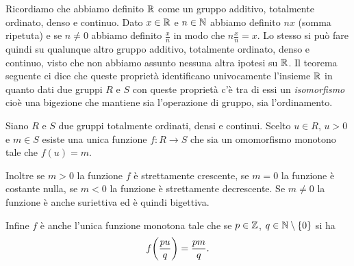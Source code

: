 Ricordiamo che abbiamo definito ${\mathbb R}$ come un gruppo additivo, 
totalmente ordinato, denso e continuo.
Dato $x\in {\mathbb R}$ e $n\in {\mathbb N}$ abbiamo definito $nx$ (somma ripetuta)
e se $n\neq 0$ abbiamo definito $\frac{x}{n}$ in modo che $n\frac{x}{n}=x$. 
Lo stesso si può fare quindi su qualunque altro gruppo additivo,
totalmente ordinato, denso e continuo, visto che non abbiamo assunto
nessuna altra ipotesi su ${\mathbb R}$. 
Il teorema seguente ci dice che queste proprietà identificano univocamente 
l'insieme ${\mathbb R}$ in quanto dati due gruppi $R$ e $S$ con queste proprietà 
c'è tra di essi un \emph{isomorfismo} cioè una bigezione che mantiene 
sia l'operazione di gruppo, sia l'ordinamento.

\begin{theorem}
  \label{th:estensione_additiva}%
  Siano $R$ e $S$ due gruppi totalmente ordinati, densi e continui. 
  Scelto $u\in R$, $u>0$ e $m\in S$
  esiste una unica funzione $f\colon R \to S$ che sia 
  un omomorfismo monotono tale che $f(u) = m$.

  Inoltre se $m>0$ la funzione $f$ è strettamente crescente,
  se $m=0$ la funzione è costante nulla, se $m<0$ la funzione 
  è strettamente decrescente. Se $m\neq 0$ la funzione 
  è anche suriettiva ed è quindi bigettiva. 
  
  Infine $f$ è anche l'unica funzione monotona tale che 
  se $p\in {\mathbb Z}$, $q \in {\mathbb N}\setminus{\left\{ 0 \right\}}$ 
  si ha 
  \[
    f{\left( \frac{pu} q \right)} = \frac{pm}{q}.
  \] 
\end{theorem}
%

